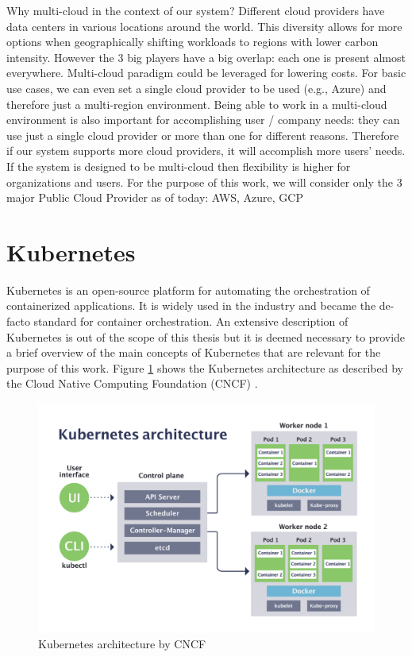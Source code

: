 Why multi-cloud in the context of our system?
Different cloud providers have data centers in various locations around the world. This diversity allows for more options when geographically shifting workloads to regions with lower carbon intensity.
However the 3 big players have a big overlap: each one is present almost everywhere.
Multi-cloud paradigm could be leveraged for lowering costs.
For basic use cases, we can even set a single cloud provider to be used (e.g., Azure) and therefore just a multi-region environment.
Being able to work in a multi-cloud environment is also important for accomplishing user / company needs: they can use just a single cloud provider or more than one for different reasons. Therefore if our system supports more cloud providers, it will accomplish more users' needs.
If the system is designed to be multi-cloud then flexibility is higher for organizations and users.
For the purpose of this work, we will consider only the 3 major Public Cloud Provider as of today: AWS, Azure, GCP

\section{Kubernetes}

Kubernetes is an open-source platform for automating the orchestration of containerized applications.
It is widely used in the industry and became the de-facto standard for container orchestration.
An extensive description of Kubernetes is out of the scope of this thesis but it is deemed necessary to provide a brief overview of the main concepts of Kubernetes that are relevant for the purpose of this work.
Figure \ref{fig:kubernetes_architecture} shows the Kubernetes architecture as described by the Cloud Native Computing Foundation (CNCF) \cite{kubernetes_cnfc}.

\begin{figure}[htb]
    \centering
    \includegraphics[width=1\linewidth]{images/kubernetes-architecture-diagram.png}
    \caption{Kubernetes architecture by CNCF \cite{kubernetes_cnfc}}
    \label{fig:kubernetes_architecture}
\end{figure}

